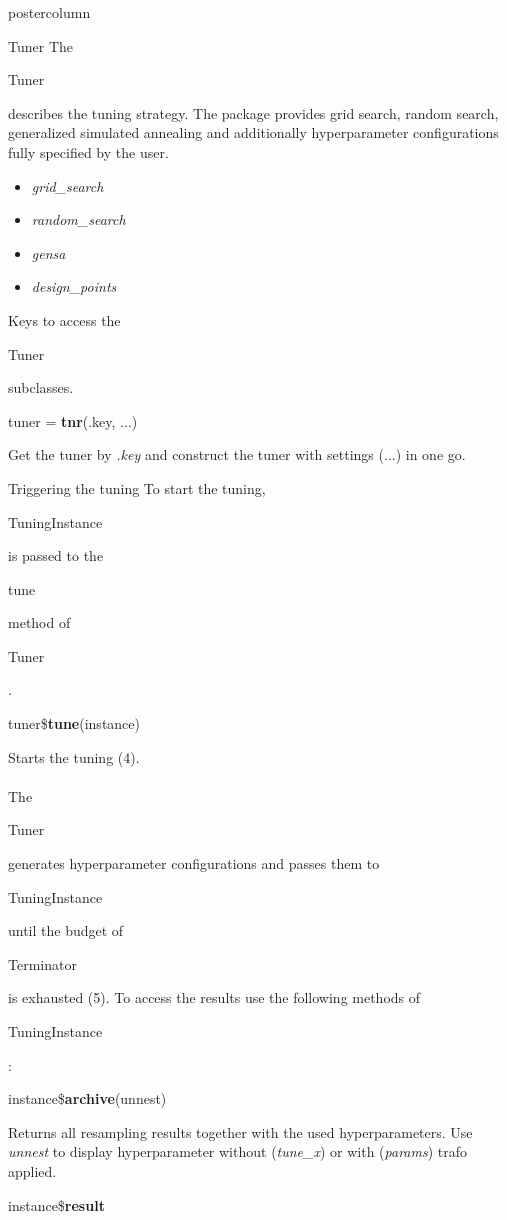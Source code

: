 \documentclass{beamer}
\newlength{\columnheight} %
\newcommand{\codeinline}[1]{\begin{codeboxinline}#1\end{codeboxinline}}
\begin{document}
\begin{frame}[fragile]{}
\begin{columns}
\begin{column}{.245\textwidth}
\begin{beamercolorbox}[center]{postercolumn}
\begin{minipage}{.98\textwidth}
					\parbox[t][\columnheight]{\textwidth}{
						\begin{myblock}{Tuner}
							The \codeinline{Tuner} describes the tuning strategy. The package provides grid search, random search, generalized simulated annealing and additionally hyperparameter configurations fully specified by the user.
							\begin{itemize}
								\item \textit{grid\_search}
								\item \textit{random\_search}
								\item \textit{gensa}
								\item \textit{design\_points}
							\end{itemize}
							\vspace{0.5cm}
							Keys to access the \codeinline{Tuner} subclasses.
							\\
							\begin{codebox}
								tuner = \textbf{tnr}(.key, ...)
							\end{codebox}
							Get the tuner by \textit{.key} and construct the tuner with settings (...) in one go.
						\end{myblock}
						\begin{myblock}{Triggering the tuning}
							To start the tuning, \codeinline{TuningInstance} is passed to the \codeinline{tune} method of \codeinline{Tuner}.
							\\
							\begin{codebox}
								tuner\$\textbf{tune}(instance)
							\end{codebox}
							Starts the tuning (4).
							\\
							\\
							The \codeinline{Tuner} generates hyperparameter configurations and passes them to \codeinline{TuningInstance} until the budget of \codeinline{Terminator} is exhausted (5). To access the results use the following methods of \codeinline{TuningInstance}:
							\\
							\begin{codebox}
								instance\$\textbf{archive}(unnest)
							\end{codebox}
							Returns all resampling results together with the used hyperparameters. Use \textit{unnest} to display hyperparameter without (\textit{tune\_x}) or with (\textit{params}) trafo applied.
							\\
							\begin{codebox}
								instance\$\textbf{result}

\end{codebox}
\end{myblock}}
\end{minipage}
\end{beamercolorbox}
\end{column}
\end{columns}
\end{frame}
\end{document}
